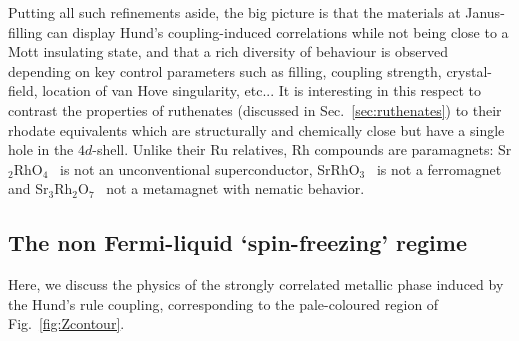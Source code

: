 \documentclass[]{ar2e-changed}%
\begin{document}
Putting all such refinements aside, the big picture is that the
materials at Janus-filling can display Hund's coupling-induced correlations while not 
being close to a Mott insulating state, and that a rich diversity of behaviour is observed 
depending on key control parameters such as filling, coupling strength, crystal-field, location of 
van Hove singularity, etc...
%
It is interesting in this respect to contrast the properties of ruthenates (discussed in
Sec.~\ref{sec:ruthenates}) to their rhodate equivalents which are
structurally and chemically close but have a single hole in the $4d$-shell. Unlike their Ru relatives, Rh
compounds are paramagnets: Sr$_2$RhO$_4$~\cite{perry_njp_2006} is not an unconventional
superconductor, SrRhO$_3$~\cite{yamaura_prb_2001} is not a ferromagnet and
Sr$_3$Rh$_2$O$_7$~\cite{yamaura_prb_2002} not a metamagnet with nematic behavior.

\subsection{The non Fermi-liquid `spin-freezing' regime}
\label{sec:spin_freezing}

Here, we discuss the physics of the strongly correlated metallic phase induced by the   
Hund's rule coupling, corresponding to the pale-coloured region of Fig.~\ref{fig:Zcontour}. 
%
\end{document}
